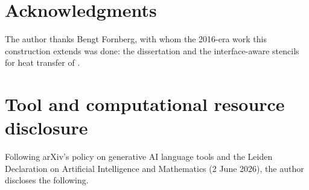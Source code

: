 \documentclass[11pt]{amsart}
\theoremstyle{definition}
\theoremstyle{remark}
\begin{document}
\begin{table}
  \centering
  \caption{The smooth ring: RMS error on the far field against the fine seed
  run at $160{,}000$ nodes, for the seeds with the diagonal rule and with the
  warp on every row; the diagonal rule over the better of warped and plain Gaussians
  on every row (--: the diagonal rule keeps no row plain and is the warp); the other
  operators at $40{,}000$ nodes; and at $s = 10^{11}$, $\delta = 0.001$, the seeds against a
  second fine run built with plain Gaussians.}
  \label{tab:ringsmooth2d}
  \footnotesize
  
\end{table}

\section*{Acknowledgments}
The author thanks Bengt Fornberg, with whom the 2016-era work this
construction extends was done: the dissertation \cite{Martin2016} and the
interface-aware stencils for heat transfer of
\cite{MartinFornberg2017heat}.

\section*{Tool and computational resource disclosure}
Following arXiv's policy on generative AI language tools and the Leiden
Declaration on Artificial Intelligence and Mathematics (2 June 2026), the
author discloses the following.
\end{document}

